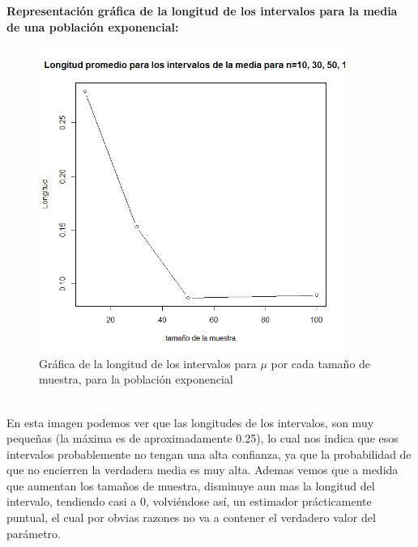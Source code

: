 \documentclass[letterpaper,12pt,onecolumn,titlepage]{article}
\begin{document}
\pagebreak\textbf{Representaci\'{o}n gr\'{a}fica de la longitud de los intervalos para la media de una poblaci\'{o}n exponencial:}
~\\ \begin{figure}[!h]
    \begin{center}
        \includegraphics[width=10cm]{Figuras/P1bM.png}
        \caption{Gr\'{a}fica de la longitud de los intervalos para $\mu$ por cada tama\~{n}o de muestra, para la poblaci\'{o}n exponencial}
        \label{fig:Densidad}
    \end{center}
\end{figure}
~\\ En esta imagen podemos ver que las longitudes de los intervalos, son muy peque\~{n}as (la m\'{a}xima es de aproximadamente 0.25), lo cual nos indica que esos intervalos probablemente no tengan una alta confianza, ya que la probabilidad de que no encierren la verdadera media es muy alta. Ademas vemos que a medida que aumentan los tama\~{n}os de muestra, disminuye aun mas la longitud del intervalo, tendiendo casi a 0, volvi\'{e}ndose as\'{i}, un estimador pr\'{a}cticamente puntual, el cual por obvias razones no va a contener el verdadero valor del par\'{a}metro. 
\end{document}
